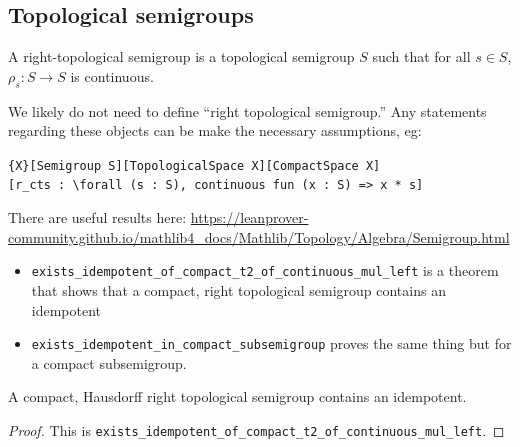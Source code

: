 \subsection{Topological semigroups}


\begin{definition}
    A right-topological semigroup is a topological semigroup $S$ such that for all $s \in S$, $\rho_s: S \to S$ is continuous.
\end{definition}

\begin{leanrmk}
    We likely do not need to define ``right topological semigroup.''  Any statements regarding these objects can be make the necessary assumptions, eg:
    \begin{center}
        \verb|{X}[Semigroup S][TopologicalSpace X][CompactSpace X]| \\ \verb|[r_cts : \forall (s : S), continuous fun (x : S) => x * s]|
    \end{center}

    There are useful results here: \url{https://leanprover-community.github.io/mathlib4_docs/Mathlib/Topology/Algebra/Semigroup.html}
    \begin{itemize}
        \item \verb|exists_idempotent_of_compact_t2_of_continuous_mul_left| is a theorem that shows that a compact, right topological semigroup contains an idempotent

        \item \verb|exists_idempotent_in_compact_subsemigroup| proves the same thing but for a compact subsemigroup.
    \end{itemize}    
\end{leanrmk}


\begin{theorem}
\leanok{}
    A compact, Hausdorff right topological semigroup contains an idempotent.
\end{theorem}

\begin{proof}
\leanok{}
    This is \verb|exists_idempotent_of_compact_t2_of_continuous_mul_left|.
\end{proof}


